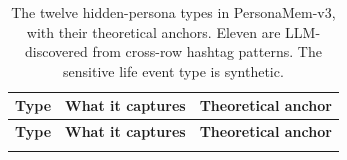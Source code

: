 \documentclass[]{fairmeta}
\begin{document}
{\footnotesize
\begin{longtable}{p{}p{}p{}}
  \caption{The twelve hidden-persona types in PersonaMem-v3, with their theoretical anchors. Eleven are LLM-discovered from cross-row hashtag patterns. The sensitive life event type is synthetic.}
  \label{table:hidden_personas} \\
  \toprule
  \textbf{Type} & \textbf{What it captures} & \textbf{Theoretical anchor} \\
  \midrule
  \endfirsthead

  \toprule
  \textbf{Type} & \textbf{What it captures} & \textbf{Theoretical anchor} \\
  \midrule
  \endhead

  \midrule
  \endfoot

  \bottomrule
  \endlastfoot


\end{longtable}}
\end{document}
